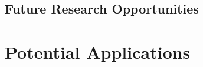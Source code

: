 \documentclass[12pt,a4paper]{report}
\begin{document}
\subsection{Future Research Opportunities}


\section{Potential Applications}







\appendix
\end{document}
